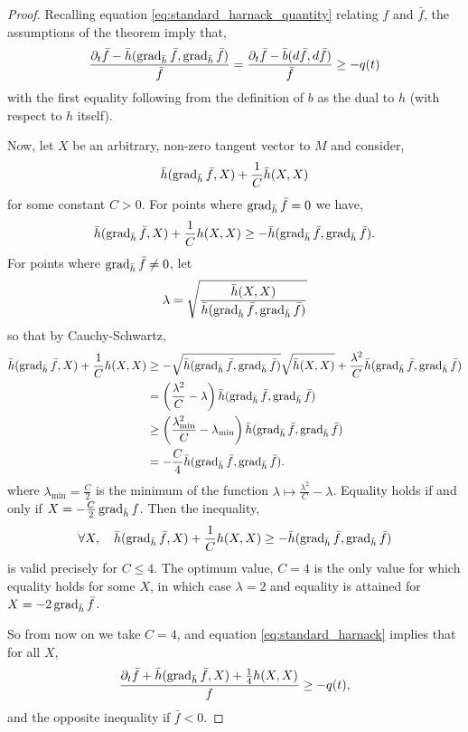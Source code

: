 \begin{proof}
Recalling equation \eqref{eq:standard_harnack_quantity} relating $f$ and $\bar{f}$, the assumptions of the theorem imply that,
\begin{equation}
\label{eq:standard_harnack}
\frac{\partial_t\bar{f} - \bar{h}(\operatorname{grad}_{\bar{h}} \bar{f}, \operatorname{grad}_{\bar{h}} \bar{f})}{\bar{f}} =  \frac{\partial_t\bar{f}-\bar{b}(d \bar{f},d \bar{f})}{\bar{f}} \geq - q(t)
\end{equation}
with the first equality following from the definition of $b$ as the dual to $h$ (with respect to $h$ itself).

Now, let $X$ be an arbitrary, non-zero tangent vector to $M$ and consider,
\[
\bar{h}(\operatorname{grad}_{\bar{h}} \bar{f}, X) + \frac{1}{C} \bar{h}(X, X)
\]
for some constant $C > 0$. For points where $\operatorname{grad}_{\bar{h}} \bar{f} = 0$ we have,
\[
\bar{h}(\operatorname{grad}_{\bar{h}} \bar{f}, X) + \frac{1}{C} h(X, X) \geq - \bar{h}(\operatorname{grad}_{\bar{h}} \bar{f}, \operatorname{grad}_{\bar{h}} \bar{f}).
\]
For points where $\operatorname{grad}_{\bar{h}} \bar{f} \ne 0$, let
\[
\lambda = \sqrt{\frac{\bar{h}(X, X)}{\bar{h}(\operatorname{grad}_{\bar{h}} \bar{f}, \operatorname{grad}_{\bar{h}} \bar{f})}}
\]
so that by Cauchy-Schwartz,
\[
\begin{split}
\bar{h}(\operatorname{grad}_{\bar{h}} \bar{f}, X) + \frac{1}{C} h(X, X) &\geq -\sqrt{\bar{h} (\operatorname{grad}_{\bar{h}} \bar{f}, \operatorname{grad}_{\bar{h}} \bar{f})} \sqrt{\bar{h}(X, X)} + \frac{\lambda^2}{C}  \bar{h}(\operatorname{grad}_{\bar{h}} \bar{f}, \operatorname{grad}_{\bar{h}} \bar{f}) \\
&= \left(\frac{\lambda^2}{C} - \lambda\right) \bar{h}(\operatorname{grad}_{\bar{h}} \bar{f}, \operatorname{grad}_{\bar{h}} \bar{f}) \\
&\geq \left(\frac{\lambda_{\min}^2}{C} - \lambda_{\min}\right) \bar{h}(\operatorname{grad}_{\bar{h}} \bar{f}, \operatorname{grad}_{\bar{h}} \bar{f}) \\
&= -\frac{C}{4} \bar{h}(\operatorname{grad}_{\bar{h}} \bar{f}, \operatorname{grad}_{\bar{h}} \bar{f}).
\end{split}
\]
where $\lambda_{\min} = \tfrac{C}{2}$ is the minimum of the function $\lambda \mapsto \tfrac{\lambda^2}{C} - \lambda$. Equality holds if and only if $X = -\tfrac{C}{2} \operatorname{grad}_{\bar{h}} f$. Then the inequality,
\[
\forall X, \quad \bar{h}(\operatorname{grad}_{\bar{h}} \bar{f}, X) + \frac{1}{C} h(X, X) \geq - \bar{h}(\operatorname{grad}_{\bar{h}} \bar{f}, \operatorname{grad}_{\bar{h}} \bar{f})
\]
is valid precisely for $C \leq 4$. The optimum value, $C=4$ is the only value for which equality holds for some $X$, in which case $\lambda = 2$ and equality is attained for $X = - 2 \operatorname{grad}_{\bar{h}} \bar{f}$.

So from now on we take $C = 4$, and equation \eqref{eq:standard_harnack} implies that for all $X$,
\begin{equation}
\label{eq:standard_harnack_all_vectors}
\frac{\partial_t \bar{f} + \bar{h}(\operatorname{grad}_{\bar{h}} \bar{f}, X) + \frac{1}{4} h(X, X)}{f} \geq - q(t),
\end{equation}
and the opposite inequality if $\bar{f} < 0$.


\end{proof}
